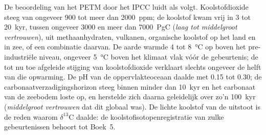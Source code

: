 De beoordeling van het PETM door het IPCC luidt als volgt. Koolstofdioxide steeg van ongeveer 900 tot meer dan
\qty{2000}{ppm}; de koolstof kwam vrij in 3 tot \qty{20}{kyr}, tussen ongeveer 3000 en meer dan
\qty{7000}{PgC} (\emph{laag tot middelgroot vertrouwen}), uit methaanhydraten, vulkanen, organische
koolstof op het land en in zee, of een combinatie daarvan. De aarde warmde 4 tot \qty{8}{\celsius} op boven
het pre-industriële niveau, ongeveer \qty{5}{\celsius} boven het klimaat vlak vóór de gebeurtenis; de tot nu toe afgeleide stijging van
koolstofdioxide verklaart slechts ongeveer de helft van die opwarming. De pH van de oppervlakteoceaan daalde
met 0.15 tot 0.30; de carbonaatverzadigingshorizon steeg binnen minder dan \qty{10}{kyr} en het carbonaat van de zeebodem
loste op, en herstelde zich daarna geleidelijk over zo'n \qty{100}{kyr} (\emph{middelgroot vertrouwen}
dat dit globaal was). De lichte koolstof van de uitstoot is de reden waarom $\delta^{13}$C daalde: de
koolstofisotopenregistratie van zulke gebeurtenissen behoort tot Boek~5.

\begin{omfigure}
\centering
{}
\par{}
\end{omfigure}

